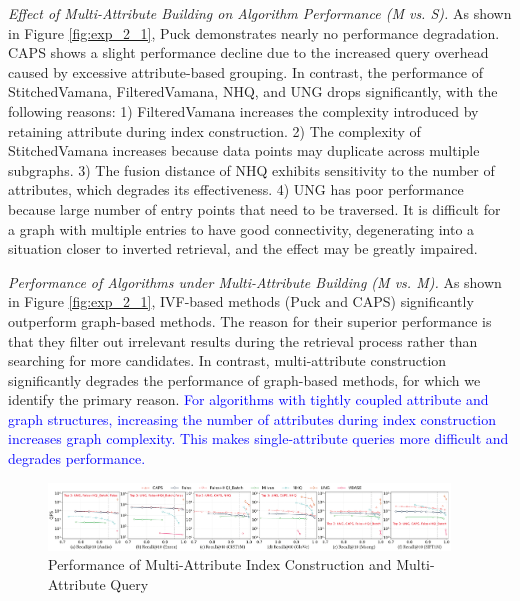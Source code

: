 \documentclass[sigconf, nonacm]{acmart}
\begin{document}
{	\textit{Effect of Multi-Attribute Building on Algorithm Performance (M vs. S).}
	As shown in Figure \ref{fig:exp_2_1}, Puck demonstrates nearly no performance degradation. CAPS shows a slight performance decline due to the increased query overhead caused by excessive attribute-based grouping. In contrast, the performance of StitchedVamana, FilteredVamana, NHQ, and UNG drops significantly, with the following reasons: 1) FilteredVamana increases the complexity introduced by retaining attribute during index construction. 2) The complexity of StitchedVamana increases because data points may duplicate across multiple subgraphs. 3) The fusion distance of NHQ exhibits sensitivity to the number of attributes, which degrades its effectiveness. 4) UNG has poor performance because large number of entry points that need to be traversed. It is difficult for a graph with multiple entries to have good connectivity, degenerating into a situation closer to inverted retrieval, and the effect may be greatly impaired.
	
	
	
	\textit{Performance of Algorithms under Multi-Attribute Building (M vs. M).}  
	As shown in Figure \ref{fig:exp_2_1}, IVF-based methods (Puck and CAPS) significantly outperform graph-based methods. The reason for their superior performance is that they filter out irrelevant results during the retrieval process rather than searching for more candidates. In contrast, multi-attribute construction significantly degrades the performance of graph-based methods, for which we identify the primary reason. 
	\textcolor{blue}{For algorithms with tightly coupled attribute and graph structures, increasing the number of attributes during index construction increases graph complexity. This makes single-attribute queries more difficult and degrades performance.}
	
	
	\begin{figure}
		\centering
		\setlength{\abovecaptionskip}{0.1cm}
		\setlength{\belowcaptionskip}{-0.25cm}
		\includegraphics[width=0.95\textwidth]{figures/exp/exp_4_1_MultiLabel_1thread.pdf}
		\caption{Performance of Multi-Attribute Index Construction and Multi-Attribute Query}
		\label{fig:exp_4_1_MultiLabel_1thread}
	\end{figure}
	
}
\end{document}
